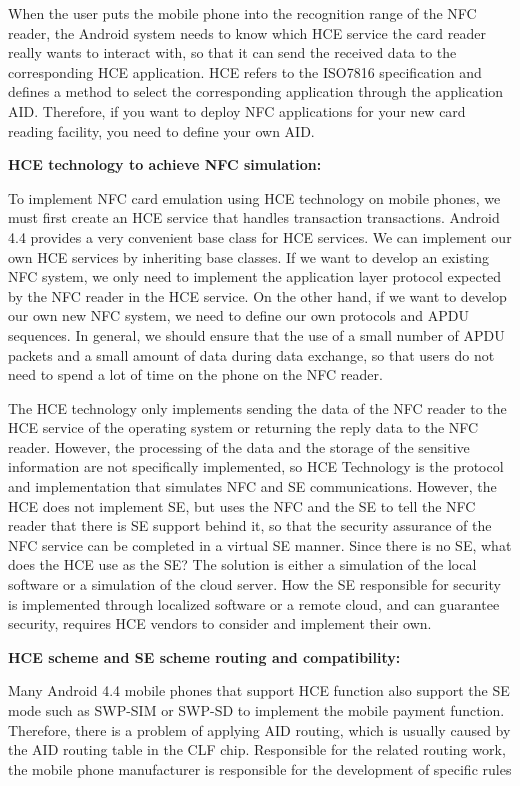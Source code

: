 \documentclass[journal]{IEEEtran}
\begin{document}
When the user puts the mobile phone into the recognition range of the NFC reader, the Android system needs to know which HCE service the card reader really wants to interact with, so that it can send the received data to the corresponding HCE application. HCE refers to the ISO7816 specification and defines a method to select the corresponding application through the application AID. Therefore, if you want to deploy NFC applications for your new card reading facility, you need to define your own AID.

\textbf{HCE technology to achieve NFC simulation:}

To implement NFC card emulation using HCE technology on mobile phones, we must first create an HCE service that handles transaction transactions. Android 4.4 provides a very convenient base class for HCE services. We can implement our own HCE services by inheriting base classes. If we want to develop an existing NFC system, we only need to implement the application layer protocol expected by the NFC reader in the HCE service. On the other hand, if we want to develop our own new NFC system, we need to define our own protocols and APDU sequences. In general, we should ensure that the use of a small number of APDU packets and a small amount of data during data exchange, so that users do not need to spend a lot of time on the phone on the NFC reader.

The HCE technology only implements sending the data of the NFC reader to the HCE service of the operating system or returning the reply data to the NFC reader. However, the processing of the data and the storage of the sensitive information are not specifically implemented, so HCE Technology is the protocol and implementation that simulates NFC and SE communications. However, the HCE does not implement SE, but uses the NFC and the SE to tell the NFC reader that there is SE support behind it, so that the security assurance of the NFC service can be completed in a virtual SE manner. Since there is no SE, what does the HCE use as the SE? The solution is either a simulation of the local software or a simulation of the cloud server. How the SE responsible for security is implemented through localized software or a remote cloud, and can guarantee security, requires HCE vendors to consider and implement their own.

\textbf{HCE scheme and SE scheme routing and compatibility:}

Many Android 4.4 mobile phones that support HCE function also support the SE mode such as SWP-SIM or SWP-SD to implement the mobile payment function. Therefore, there is a problem of applying AID routing, which is usually caused by the AID routing table in the CLF chip. Responsible for the related routing work, the mobile phone manufacturer is responsible for the development of specific rules
\end{document}
